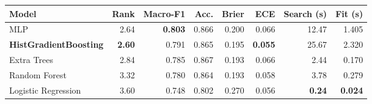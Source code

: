 \begin{tabular}{lrrrrrrr}
\hline
Model & Rank & Macro-F1 & Acc. & Brier & ECE & Search (s) & Fit (s) \\
\hline
MLP & 2.64 & \textbf{0.803} & 0.866 & 0.200 & 0.066 & 12.47 & 1.405 \\
\textbf{HistGradientBoosting} & \textbf{2.60} & 0.791 & 0.865 & 0.195 & \textbf{0.055} & 25.67 & 2.320 \\
Extra Trees & 2.84 & 0.785 & 0.867 & 0.193 & 0.066 & 2.44 & 0.170 \\
Random Forest & 3.32 & 0.780 & 0.864 & 0.193 & 0.058 & 3.78 & 0.279 \\
Logistic Regression & 3.60 & 0.748 & 0.802 & 0.270 & 0.056 & \textbf{0.24} & \textbf{0.024} \\
\hline
\end{tabular}
